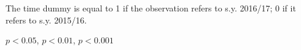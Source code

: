 \begin{table}[htbp]
\begin{adjustbox}{width=1\textwidth}
\begin{threeparttable}
\begin{tablenotes}
\item The time dummy is equal to 1 if the observation refers to s.y. 2016/17; 0 if it refers to s.y. 2015/16. \\
\item \sym{*} \(p<0.05\), \sym{**} \(p<0.01\), \sym{***} \(p<0.001\)
\end{tablenotes}
\end{threeparttable}
\end{adjustbox}
\label{tab:stability}
\end{table}
